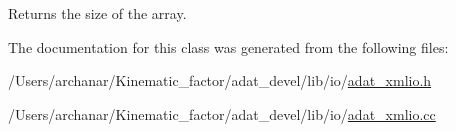 Returns the size of the array. 



The documentation for this class was generated from the following files\+:\begin{DoxyCompactItemize}
\item 
/\+Users/archanar/\+Kinematic\+\_\+factor/adat\+\_\+devel/lib/io/\mbox{\hyperlink{lib_2io_2adat__xmlio_8h}{adat\+\_\+xmlio.\+h}}\item 
/\+Users/archanar/\+Kinematic\+\_\+factor/adat\+\_\+devel/lib/io/\mbox{\hyperlink{adat__xmlio_8cc}{adat\+\_\+xmlio.\+cc}}\end{DoxyCompactItemize}
